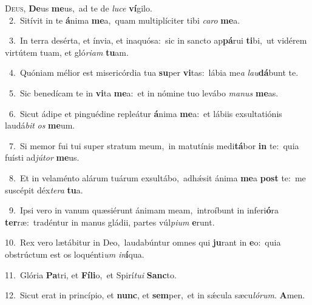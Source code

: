 \lettrine{\initial\textcolor{\initialcolor}{D}}{eus,} \textbf{De}\-us \textbf{me}\-us,~\star ad te de \textit{lu}\-\textit{ce} \textbf{ví}\-gilo.\\
{\numbfont\textcolor{\numbcolor}{~2.}}~Sitívit in te \textbf{á}\-nima \textbf{me}\-a,~\star quam multiplíciter tibi \textit{ca}\-\textit{ro} \textbf{me}\-a.\par
{\numbfont\textcolor{\numbcolor}{~3.}}~In terra desérta, et ínvia, et inaquósa:~\dagger sic in sancto ap\-\textbf{pá}\-rui \textbf{ti}\-bi,~\star ut vidérem virtútem tuam, et gló\-\textit{ri}\-\textit{am} \textbf{tu}\-am.\par
{\numbfont\textcolor{\numbcolor}{~4.}}~Quóniam mélior est misericórdia tua \textbf{su}\-per \textbf{vi}\-tas:~\star lábia me\textit{a} \textit{lau}\-\textbf{dá}bunt te.\par
{\numbfont\textcolor{\numbcolor}{~5.}}~Sic benedícam te in \textbf{vi}\-ta \textbf{me}\-a:~\star et in nómine tuo levábo \textit{ma}\-\textit{nus} \textbf{me}\-as.\par
{\numbfont\textcolor{\numbcolor}{~6.}}~Sicut ádipe et pinguédine repleátur \textbf{á}\-nima \textbf{me}\-a:~\star et lábiis exsultatiónis laudá\textit{bit} \textit{os} \textbf{me}\-um.\par
{\numbfont\textcolor{\numbcolor}{~7.}}~Si memor fui tui super stratum meum,~\dagger in matutínis medi\-\textbf{tá}\-bor \textbf{in} te:~\star quia fuísti ad\-\textit{jú}\-\textit{tor} \textbf{me}\-us.\par
{\numbfont\textcolor{\numbcolor}{~8.}}~Et in velaménto alárum tuárum exsultábo,~\dagger adhǽsit ánima \textbf{me}\-a \textbf{post} te:~\star me suscépit déx\-\textit{te}\-\textit{ra} \textbf{tu}\-a.\par
{\numbfont\textcolor{\numbcolor}{~9.}}~Ipsi vero in vanum quæsiérunt ánimam meam,~\dagger introíbunt in inferi\-\textbf{ó}\-ra \textbf{ter}\-ræ:~\star tradéntur in manus gládii, partes vúl\-\textit{pi}\-\textit{um} \textbf{e}\-runt.\par
{\numbfont\textcolor{\numbcolor}{10.}}~Rex vero lætábitur in Deo,~\dagger laudabúntur omnes qui \textbf{ju}\-rant in \textbf{e}\-o:~\star quia obstrúctum est os loquénti\textit{um} \textit{in}\-\textbf{í}qua.\par
{\numbfont\textcolor{\numbcolor}{11.}}~Glória \textbf{Pa}\-tri, et \textbf{Fí}\-\textbf{li}o,~\star et Spirí\-\textit{tu}\-\textit{i} \textbf{Sanc}\-to.\par
{\numbfont\textcolor{\numbcolor}{12.}}~Sicut erat in princípio, et \textbf{nunc}\-, et \textbf{sem}\-per,~\star et in sǽcula sæcu\-\textit{ló}\-\textit{rum}. \textbf{A}\-men.\par
